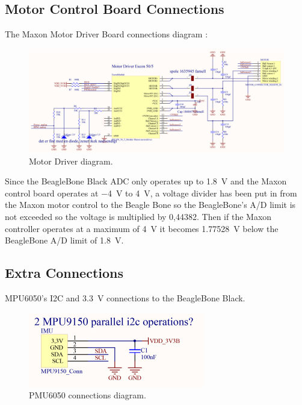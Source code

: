 \subsection{Motor Control Board Connections}
The Maxon Motor Driver Board connections diagram :\\

\begin{figure}[H]
	\centering
	\includegraphics[scale=0.92]{figures/MotorDriver.pdf}
	\caption{Motor Driver diagram.}
	\label{labMotorDriver}
\end{figure}\vspace{-5mm}

Since the BeagleBone Black ADC only operates up to \SI{1,8}{V} and the Maxon control board operates at \SI{-4}{V} to \SI{4}{V}, a voltage divider has been put in from the Maxon motor control to the Beagle Bone so the BeagleBone’s A/D limit is not exceeded so the voltage is multiplied by 0,44382. Then if the Maxon controller operates at a maximum of \SI{4}{V} it becomes \SI{1,77528}{V} below the BeagleBone A/D limit of \SI{1,8}{V}.

\subsection{Extra Connections}
MPU6050's I2C and \SI{3,3}{V} connections to the BeagleBone Black.
\begin{figure}[H]
	\centering
	\includegraphics[scale=0.92]{figures/PMU9150.pdf}
	\caption{PMU6050 connections diagram.}
	\label{labPMU9150}
\end{figure}\vspace{-5mm}

